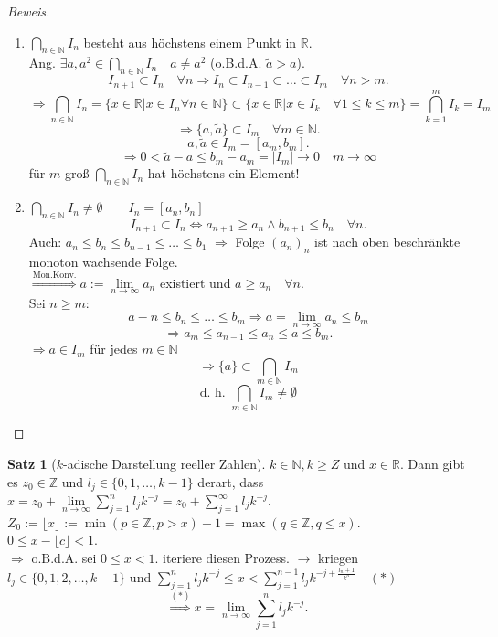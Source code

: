 \documentclass[12pt,a4paper,titlepage]{article} %
\theoremstyle{definition}
\newtheorem{satz}{Satz}[subsection]
\theoremstyle{remark}
\newenvironment{bew}{\begin{proof}[Beweis]}{\end{proof}}
\newcommand{\N}{\mathbb{N}}
\newcommand{\Z}{\mathbb{Z}}
\newcommand{\R}{\mathbb{R}}
\newcommand{\limes}[1]{\lim\limits_{#1\rightarrow\infty}}
\begin{document}
\begin{bew}
	\begin{enumerate}
		\item \( \bigcap_{n\in\N} I_n \) besteht aus höchstens einem Punkt in \(\R\).\\
		Ang. \( \exists a, a^2 \in \bigcap_{n\in\N} I_n \quad a\neq a^2 \) (o.B.d.A. \(\tilde{a}>a\)).\\
		\[I_{n+1} \subset I_n \quad\forall n \Rightarrow I_n \subset I_{n-1} \subset \ldots\subset I_m \quad \forall n>m.\]
		\[ \Rightarrow \bigcap_{n\in\N} I_n = \{ x\in\R| x\in I_n \forall n\in\N \} \subset \{ x\in\R|x\in I_k \quad \forall 1\leq k \leq m \} = \bigcap_{k=1}^m I_k = I_m \]
		\[ \Rightarrow \{ a,\tilde{a} \} \subset I_m \quad\forall m\in\N. \]
		\[a,\tilde{a} \in I_m = [a_m,b_m]. \]
		\[\Rightarrow 0<\tilde{a}-a \leq b_m - a_m = |I_m| \rightarrow 0 \quad m\rightarrow\infty \]
		\Lightning für \(m\) groß \(\bigcap_{n\in\N} I_n\) hat höchstens ein Element!
		\item \( \bigcap_{n\in\N} I_n \neq \emptyset \qquad I_n = [a_n,b_n] \)\\
		\[I_{n+1} \subset I_n \Leftrightarrow a_{n+1} \geq a_n \wedge b_{n+1} \leq b_n \quad \forall n. \]
		Auch: \( a_n \leq b_n \leq b_{n-1} \leq \ldots\leq b_1 \)
		\( \Rightarrow \) Folge \((a_n)_n\) ist nach oben beschränkte monoton wachsende Folge.\\
		\( \overset{\text{Mon.Konv.}}{\Rightarrow} a:= \limes{n} a_n \) existiert und \(a\geq a_n \quad \forall n \).\\
		Sei \(n\geq m:\)
		\[a-n\leq b_n\leq\ldots\leq b_m \Rightarrow a = \limes{n} a_n \leq b_m \]\[\Rightarrow a_m\leq a_{n-1}\leq a_n\leq a\leq b_m. \]
		\( \Rightarrow a\in I_m\) für jedes \(m\in\N\)\\
		\[  \Rightarrow \{a\}\subset \bigcap_{m\in\N} I_m \]
		\[ \text{d. h. } \bigcap_{m\in\N} I_m \neq \emptyset \]
	\end{enumerate}
\end{bew}
\begin{satz}[\(k\)-adische Darstellung reeller Zahlen]
	\(k\in\N, k\geq Z\) und \(x\in\R\). Dann gibt es \(z_0\in \Z\) und \(l_j \in\{0,1,\ldots,k-1\} \) derart, dass \(x = z_0 + \limes{n} \sum_{j=1}^{n} l_j k^{-j} = z_0 + \sum_{j=1}^{\infty} l_j k^{-j} \).\\
	\(Z_0 := \lfloor x \rfloor := \min(p\in\Z, p>x) -1 = \max(q\in\Z, q\leq x). \)\\
	\( 0\leq x-\lfloor c\rfloor <1. \)\\
	\(\Rightarrow\) o.B.d.A. sei \(0\leq x<1\).
	iteriere diesen Prozess.
	\(\rightarrow\) kriegen \(l_j \in \{0,1,2,\ldots,k-1 \} \) und \(\sum_{j=1}^{n} l_j k^{-j} \leq x < \sum_{j=1}^{n-1} l_j k^{-j + \frac{l_n + 1}{k^n}} \quad (*)\)\\
	\[ \overset{(*)}{\Rightarrow} x = \limes{n} \sum_{j=1}^{n} l_j k^{-j}. \]
\end{satz}
\end{document}
